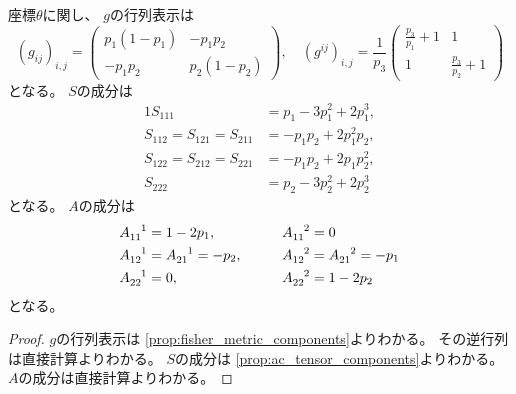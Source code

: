 \documentclass[report]{jlreq}
\begin{document}
\begin{proposition}[$n = 3$での$g, S, A$の計算]
    座標$\theta$に関し、
    $g$の行列表示は
    \begin{equation}
        (g_{ij})_{i, j}
            = \begin{pmatrix}
                p_1 (1 - p_1) & - p_1 p_2 \\
                - p_1 p_2 & p_2 (1 - p_2)
            \end{pmatrix},
            \quad
        (g^{ij})_{i, j}
            = \frac{1}{p_3}
                \begin{pmatrix}
                    \frac{p_3}{p_1} + 1 & 1 \\
                    1 & \frac{p_3}{p_2} + 1
                \end{pmatrix}
    \end{equation}
    となる。
    $S$の成分は
    \begin{alignat}{1}
        S_{111}
            &= p_1 - 3 p_1^2 + 2 p_1^3, \\
        S_{112} = S_{121} = S_{211}
            &= - p_1 p_2 + 2 p_1^2 p_2, \\
        S_{122} = S_{212} = S_{221}
            &= - p_1 p_2 + 2 p_1 p_2^2, \\
        S_{222}
            &= p_2 - 3 p_2^2 + 2 p_2^3
    \end{alignat}
    となる。
    $A$の成分は
    \begin{alignat}{2}
        A_{11}^{\hphantom{11}1}
            &=
                1 - 2p_1,
                \qquad
        &A_{11}^{\hphantom{11}2}
            &=
                0
                \\
        A_{12}^{\hphantom{12}1}
            &=
                A_{21}^{\hphantom{21}1}
            =
                - p_2,
                \qquad
        &A_{12}^{\hphantom{12}2}
            &=
                A_{21}^{\hphantom{21}2}
            =
                - p_1
                \\
        A_{22}^{\hphantom{22}1}
            &=
                0,
                \qquad
        &A_{22}^{\hphantom{22}2}
            &=
                1 - 2p_2
    \end{alignat}
    となる。
\end{proposition}

\begin{proof}
    $g$の行列表示は
    \cref{prop:fisher_metric_components}よりわかる。
    その逆行列は直接計算よりわかる。
    $S$の成分は
    \cref{prop:ac_tensor_components}よりわかる。
    $A$の成分は直接計算よりわかる。
\end{proof}
\end{document}
